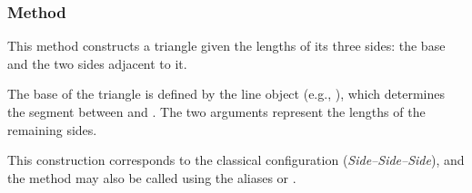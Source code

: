 \begin{minipage}{.35\textwidth}
\begin{center}
\end{center}
\end{minipage}
\begin{minipage}{.65\textwidth}
\begin{tkzexample}
\end{tkzexample}
\end{minipage}


\subsubsection{Method } %
\label{ssub:triangle_with_three_given_sides}

This method constructs a triangle given the lengths of its three sides: the base and the two sides adjacent to it.

\medskip
\noindent
The base of the triangle is defined by the line object (e.g., ), which determines the segment between  and . The two arguments  represent the lengths of the remaining sides.

\medskip
\noindent
This construction corresponds to the classical  configuration (\textit{Side–Side–Side}), and the method may also be called using the aliases  or .

\vspace{1em}

